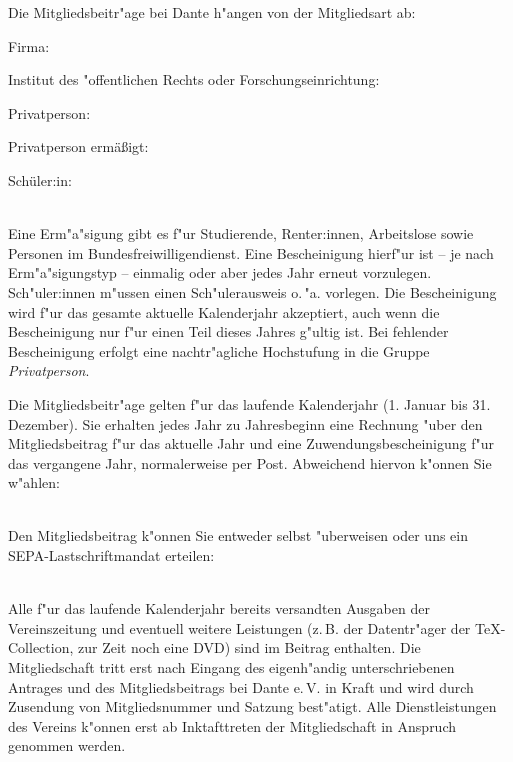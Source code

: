\documentclass[12pt,ngerman,parskip]{scrartcl}
\begin{document}
\begin{savenotes}
\begin{Form}
Die Mitgliedsbeitr"age bei Dante h"angen von der
Mitgliedsart ab:
\begin{itemize*}
\item
Firma: 
\item Institut des "offentlichen Rechts oder
Forschungseinrichtung: 
\item Privatperson: 
\item Privatperson ermäßigt: 
\item Schüler:in: 
\end{itemize*}\\
Eine Erm"a"sigung gibt es f"ur Studierende, Renter:innen,
Arbeitslose sowie Personen im Bundesfreiwilligendienst. Eine
Bescheinigung hierf"ur ist -- je nach Erm"a"sigungstyp --
einmalig oder aber
jedes Jahr erneut vorzulegen. Sch"uler:innen m"ussen
einen Sch"ulerausweis o.\,"a. vorlegen.
Die Bescheinigung wird f"ur das gesamte aktuelle Kalenderjahr
akzeptiert, auch wenn die Bescheinigung nur f"ur einen Teil
dieses Jahres g"ultig ist.
Bei fehlender Bescheinigung erfolgt eine nachtr"agliche
Hochstufung in die Gruppe \emph{Privatperson}.


Die Mitgliedsbeitr"age gelten f"ur das laufende Kalenderjahr
(1. Januar bis 31. Dezember). Sie erhalten jedes Jahr zu
Jahresbeginn eine
Rechnung "uber den Mitgliedsbeitrag f"ur das aktuelle Jahr und
eine Zuwendungsbescheinigung f"ur das vergangene Jahr,
normalerweise per Post. Abweichend hiervon k"onnen Sie
w"ahlen:\\
\\


Den Mitgliedsbeitrag k"onnen Sie entweder selbst "uberweisen
oder uns ein SEPA-Lastschriftmandat erteilen:\\
\\

Alle f"ur das laufende Kalenderjahr bereits versandten
Ausgaben der Vereinszeitung und eventuell weitere Leistungen
(z.\,B. der Datentr"ager der \TeX-Collection, zur Zeit noch eine
DVD) sind im Beitrag enthalten. Die Mitgliedschaft tritt
erst nach Eingang des eigenh"andig unterschriebenen Antrages
und des Mitgliedsbeitrags bei Dante e.\,V. in Kraft und wird
durch Zusendung von Mitgliedsnummer und Satzung best"atigt.
Alle Dienstleistungen des Vereins k"onnen erst ab
Inktafttreten der Mitgliedschaft in Anspruch genommen
werden.


\end{Form}
\end{savenotes}
\end{document}
